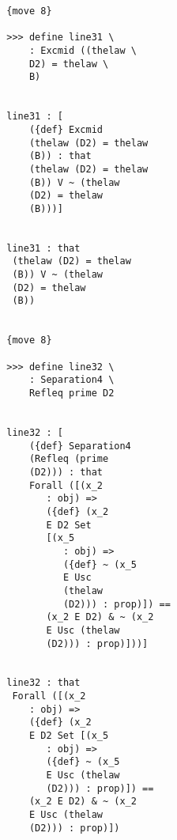 \documentclass[12pt]{article}
\begin{document}
\begin{verbatim}
                           {move 8}

                           >>> define line31 \
                               : Excmid ((thelaw \
                               D2) = thelaw \
                               B)


                           line31 : [
                               ({def} Excmid 
                               (thelaw (D2) = thelaw 
                               (B)) : that 
                               (thelaw (D2) = thelaw 
                               (B)) V ~ (thelaw 
                               (D2) = thelaw 
                               (B)))]


                           line31 : that 
                            (thelaw (D2) = thelaw 
                            (B)) V ~ (thelaw 
                            (D2) = thelaw 
                            (B))


                           {move 8}

                           >>> define line32 \
                               : Separation4 \
                               Refleq prime D2


                           line32 : [
                               ({def} Separation4 
                               (Refleq (prime 
                               (D2))) : that 
                               Forall ([(x_2 
                                  : obj) => 
                                  ({def} (x_2 
                                  E D2 Set 
                                  [(x_5 
                                     : obj) => 
                                     ({def} ~ (x_5 
                                     E Usc 
                                     (thelaw 
                                     (D2))) : prop)]) == 
                                  (x_2 E D2) & ~ (x_2 
                                  E Usc (thelaw 
                                  (D2))) : prop)]))]


                           line32 : that 
                            Forall ([(x_2 
                               : obj) => 
                               ({def} (x_2 
                               E D2 Set [(x_5 
                                  : obj) => 
                                  ({def} ~ (x_5 
                                  E Usc (thelaw 
                                  (D2))) : prop)]) == 
                               (x_2 E D2) & ~ (x_2 
                               E Usc (thelaw 
                               (D2))) : prop)])



\end{verbatim}
\end{document}

